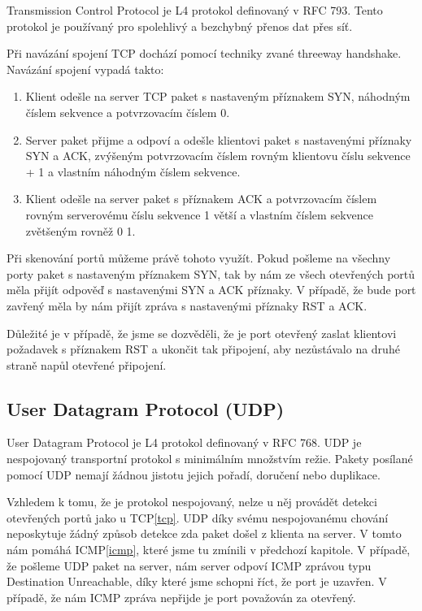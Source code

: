 \documentclass[../projekt.tex]{subfiles}
\begin{document}
Transmission Control Protocol je L4 protokol definovaný v RFC 793\cite{RFC0793}. Tento protokol je používaný pro spolehlivý a bezchybný přenos dat přes síť.

Při navázání spojení TCP dochází pomocí techniky zvané threeway handshake. Navázání spojení vypadá takto:
\begin{enumerate}
    \item Klient odešle na server TCP paket s nastaveným příznakem SYN, náhodným číslem sekvence a potvrzovacím číslem 0.
    \item Server paket přijme a odpoví a odešle klientovi paket s nastavenými příznaky SYN a ACK, zvýšeným potvrzovacím číslem rovným klientovu číslu sekvence + 1 a vlastním náhodným číslem sekvence.
    \item Klient odešle na server paket s příznakem ACK a potvrzovacím číslem rovným serverovému číslu sekvence 1 větší a vlastním číslem sekvence zvětšeným rovněž 0 1.
\end{enumerate} 

Při skenování portů můžeme právě tohoto využít. Pokud pošleme na všechny porty paket s nastaveným příznakem SYN, tak by nám ze všech otevřených portů měla přijít odpověď s nastavenými SYN a ACK příznaky. V případě, že bude port zavřený měla by nám přijít zpráva s nastavenými příznaky RST a ACK. 

Důležité je v případě, že jsme se dozvěděli, že je port otevřený zaslat klientovi požadavek s příznakem RST a ukončit tak připojení, aby nezůstávalo na druhé straně napůl otevřené připojení.

\subsection{User Datagram Protocol (UDP)} \label{udp}

User Datagram Protocol je L4 protokol definovaný v RFC 768\cite{RFC0768}. UDP je nespojovaný transportní protokol s minimálním množstvím režie. Pakety posílané pomocí UDP nemají žádnou jistotu jejich pořadí, doručení nebo duplikace. 

Vzhledem k tomu, že je protokol nespojovaný, nelze u něj provádět detekci otevřených portů jako u TCP\ref{tcp}. UDP díky svému nespojovanému chování neposkytuje žádný způsob detekce zda paket došel z klienta na server. V tomto nám pomáhá ICMP\ref{icmp}, které jsme tu zmínili v předchozí kapitole. V případě, že pošleme UDP paket na server, nám server odpoví ICMP zprávou typu Destination Unreachable, díky které jsme schopni říct, že port je uzavřen. V případě, že nám ICMP zpráva nepřijde je port považován za otevřený.
\end{document}
